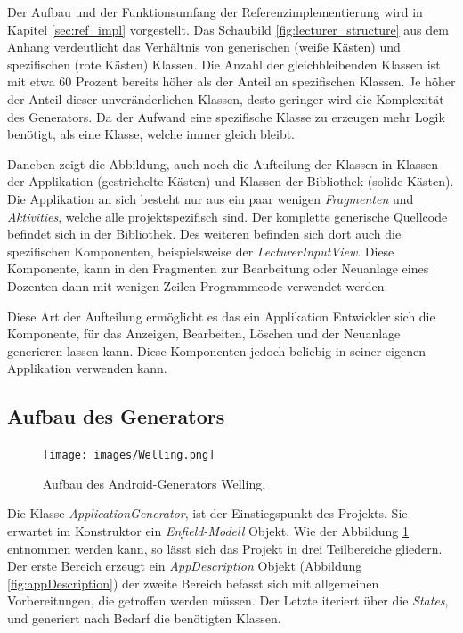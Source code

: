 Der Aufbau und der Funktionsumfang der Referenzimplementierung wird in Kapitel \ref{sec:ref_impl} vorgestellt. Das Schaubild \ref{fig:lecturer_structure} aus dem Anhang verdeutlicht das Verhältnis von generischen (weiße Kästen) und spezifischen (rote Kästen) Klassen. Die Anzahl der gleichbleibenden Klassen ist mit etwa 60 Prozent bereits höher als der Anteil an spezifischen Klassen. Je höher der Anteil dieser unveränderlichen Klassen, desto geringer wird die Komplexität des Generators. Da der Aufwand eine spezifische Klasse zu erzeugen mehr Logik benötigt, als eine Klasse, welche immer gleich bleibt.

Daneben zeigt die Abbildung, auch noch die Aufteilung der Klassen in Klassen der Applikation (gestrichelte Kästen) und Klassen der Bibliothek (solide Kästen). Die Applikation an sich besteht nur aus ein paar wenigen \textit{Fragmenten} und \textit{Aktivities}, welche alle projektspezifisch sind. Der komplette generische Quellcode befindet sich in der Bibliothek. Des weiteren befinden sich dort auch die spezifischen Komponenten, beispielsweise der \textit{LecturerInputView}. Diese Komponente, kann in den Fragmenten zur Bearbeitung oder Neuanlage eines Dozenten dann mit wenigen Zeilen Programmcode verwendet werden.

Diese Art der Aufteilung ermöglicht es das ein Applikation Entwickler sich die Komponente, für das Anzeigen, Bearbeiten, Löschen und der Neuanlage generieren lassen kann. Diese Komponenten jedoch beliebig in seiner eigenen Applikation verwenden kann.

\subsection{Aufbau des Generators}

\begin{figure}[H]
	\begin{center}
		\texttt{[image: images/Welling.png]}
		\caption{Aufbau des Android-Generators Welling.}
		\label{fig:welling}
	\end{center}
\end{figure}


Die Klasse \textit{ApplicationGenerator}, ist der Einstiegspunkt des Projekts. Sie erwartet im Konstruktor ein \textit{Enfield-Modell} Objekt. Wie der Abbildung \ref{fig:welling} entnommen werden kann, so lässt sich das Projekt in drei Teilbereiche gliedern. Der erste Bereich erzeugt ein \textit{AppDescription} Objekt (Abbildung \ref{fig:appDescription}) der zweite Bereich befasst sich mit allgemeinen Vorbereitungen, die getroffen werden müssen. Der Letzte iteriert über die \textit{States}, und generiert nach Bedarf die benötigten Klassen.

